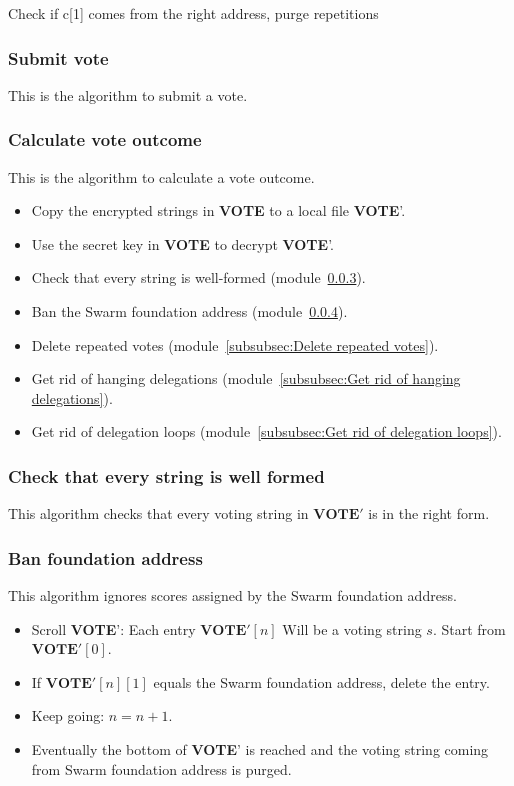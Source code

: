 \documentclass[submission, copyright,creativecommons,sharealike,noncommercial]{eptcs}
\newcommand{\Vote}{\textbf{VOTE}\xspace}
\begin{document}
Check if c[1] comes from the right address, purge repetitions
	
\subsubsection{Submit vote}\label{subsubsec:submit vote}
	This is the algorithm to submit a vote.
	
	
\subsubsection{Calculate vote outcome}\label{subsubsec:Calculate vote outcome}
	This is the algorithm to calculate a vote outcome.
	\begin{itemize}
		\item Copy the encrypted strings in \Vote to a local file \Vote'.
		\item Use the secret key in \Vote to decrypt \Vote'.
		\item Check that every string is well-formed (module~\ref{subsubsec:Check that every string is well formed}).
		\item Ban the Swarm foundation address (module~\ref{subsubsec:Ban foundation address}).
		\item Delete repeated votes (module~\ref{subsubsec:Delete repeated votes}).
		\item Get rid of hanging delegations (module~\ref{subsubsec:Get rid of hanging delegations}).
		\item Get rid of delegation loops (module~\ref{subsubsec:Get rid of delegation loops}).
		
	\end{itemize}

\subsubsection{Check that every string is well formed}\label{subsubsec:Check that every string is well formed}
	This algorithm checks that every voting string in $\Vote'$ is in the right form.
	
	
	
	
	
\subsubsection{Ban foundation address}\label{subsubsec:Ban foundation address}
	This algorithm ignores scores assigned by the Swarm foundation address.
	\begin{itemize}
		\item Scroll \Vote': Each entry $\Vote'[n]$ Will be a voting string $s$. Start from $\Vote'[0]$.	
		\item If $\Vote'[n][1]$ equals the Swarm foundation address, delete the entry.
		\item Keep going: $n = n+1$. 
		\item Eventually the bottom of \Vote' is reached and the voting string coming from Swarm foundation address is purged.
	\end{itemize}	
	
\end{document}
